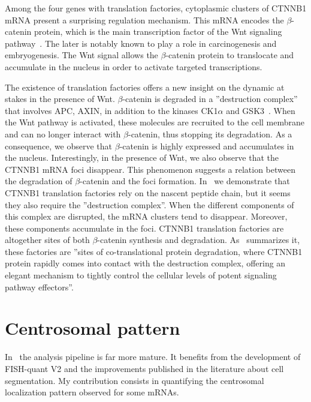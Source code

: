 Among the four genes with translation factories, cytoplasmic clusters of CTNNB1 \ac{mRNA} present a surprising regulation mechanism.
This \ac{mRNA} encodes the $\beta$-catenin protein, which is the main transcription factor of the Wnt signaling pathway~\cite{Grainger_2018}.
The later is notably known to play a role in carcinogenesis and embryogenesis.
The Wnt signal allows the $\beta$-catenin protein to translocate and accumulate in the nucleus in order to activate targeted transcriptions.

The existence of translation factories offers a new insight on the dynamic at stakes in the presence of Wnt.
$\beta$-catenin is degraded in a ''destruction complex'' that involves APC, AXIN, in addition to the kinases CK1$\alpha$ and GSK3~\cite{stamos_catenin_2013}.
When the Wnt pathway is activated, these molecules are recruited to the cell membrane and can no longer interact with $\beta$-catenin, thus stopping its degradation.
As a consequence, we observe that $\beta$-catenin is highly expressed and accumulates in the nucleus.
Interestingly, in the presence of Wnt, we also observe that the CTNNB1 \ac{mRNA} foci disappear.
This phenomenon suggests a relation between the degradation of $\beta$-catenin and the foci formation.
In~\cite{CHOUAIB_2020} we demonstrate that CTNNB1 translation factories rely on the nascent peptide chain, but it seems they also require the ''destruction complex''.
When the different components of this complex are disrupted, the \ac{mRNA} clusters tend to disappear.
Moreover, these components accumulate in the foci.
CTNNB1 translation factories are altogether sites of both $\beta$-catenin synthesis and degradation.
As~\cite{Chin_2020} summarizes it, these factories are ''sites of co-translational protein degradation, where CTNNB1 protein rapidly comes into contact with the destruction complex, offering an elegant mechanism to tightly control the cellular levels of potent signaling pathway effectors''.

\section{Centrosomal pattern}
\label{sec:centrosomal}

In~\cite{safieddine_choreography_2021} the analysis pipeline is far more mature.
It benefits from the development of FISH-quant V2 and the improvements published in the literature about cell segmentation.
My contribution consists in quantifying the centrosomal localization pattern observed for some \ac{mRNA}s.

